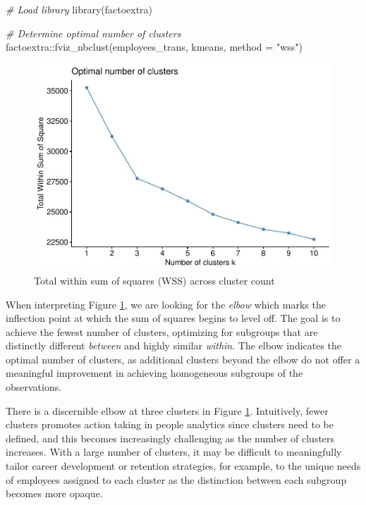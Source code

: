 \documentclass[
]{book}
\newenvironment{Shaded}{\begin{snugshade}}{\end{snugshade}}
\newcommand{\AttributeTok}[1]{\textcolor[rgb]{0.77,0.63,0.00}{#1}}
\newcommand{\CommentTok}[1]{\textcolor[rgb]{0.56,0.35,0.01}{\textit{#1}}}
\newcommand{\FunctionTok}[1]{\textcolor[rgb]{0.00,0.00,0.00}{#1}}
\newcommand{\NormalTok}[1]{#1}
\newcommand{\SpecialCharTok}[1]{\textcolor[rgb]{0.00,0.00,0.00}{#1}}
\newcommand{\StringTok}[1]{\textcolor[rgb]{0.31,0.60,0.02}{#1}}
\begin{document}
\begin{Shaded}
\begin{Highlighting}[]
\CommentTok{\# Load library}
\FunctionTok{library}\NormalTok{(factoextra)}

\CommentTok{\# Determine optimal number of clusters}
\NormalTok{factoextra}\SpecialCharTok{::}\FunctionTok{fviz\_nbclust}\NormalTok{(employees\_trans, kmeans, }\AttributeTok{method =} \StringTok{"wss"}\NormalTok{)}
\end{Highlighting}
\end{Shaded}

\begin{figure}

{\centering \includegraphics[width=1\linewidth]{The_Fundamentals_of_People_Analytics_files/figure-latex/kmeans-elbow-plot-1} 

}

\caption{Total within sum of squares (WSS) across cluster count}\label{fig:kmeans-elbow-plot}
\end{figure}

When interpreting Figure \ref{fig:kmeans-elbow-plot}, we are looking for the \emph{elbow} which marks the inflection point at which the sum of squares begins to level off. The goal is to achieve the fewest number of clusters, optimizing for subgroups that are distinctly different \emph{between} and highly similar \emph{within}. The elbow indicates the optimal number of clusters, as additional clusters beyond the elbow do not offer a meaningful improvement in achieving homogeneous subgroups of the observations.

There is a discernible elbow at three clusters in Figure \ref{fig:kmeans-elbow-plot}. Intuitively, fewer clusters promotes action taking in people analytics since clusters need to be defined, and this becomes increasingly challenging as the number of clusters increases. With a large number of clusters, it may be difficult to meaningfully tailor career development or retention strategies, for example, to the unique needs of employees assigned to each cluster as the distinction between each subgroup becomes more opaque.
\end{document}
